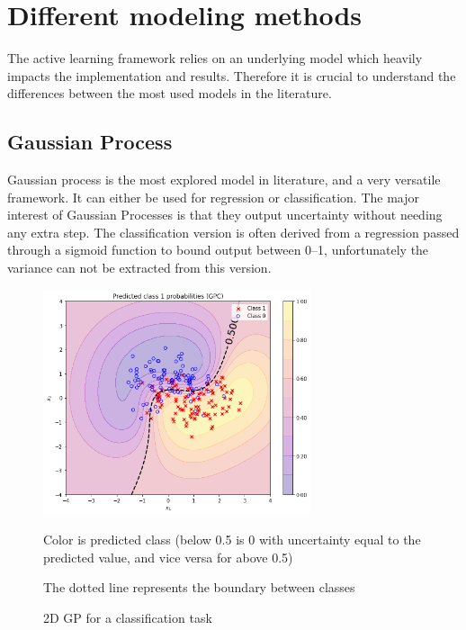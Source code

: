\documentclass[11pt]{article}
\begin{document}
\section{Different modeling methods}
The active learning framework relies on an underlying model which heavily impacts the implementation and results. Therefore it is crucial to understand the differences between the most used models in the literature.

\subsection{Gaussian Process}
Gaussian process is the most explored model in literature, and a very versatile framework\cite{rasmussen_gaussian_2005}. It can either be used for regression or classification. The major interest of Gaussian Processes is that they output uncertainty without needing any extra step. The classification version is often derived from a regression passed through a sigmoid function to bound output between 0--1, unfortunately the variance can not be extracted from this version\cite{jensen_bounded_2013}\cite{nickisch_approximations_2008}\cite{snelson_warped_2003}.

\begin{figure}[H]
  \centering
  \includegraphics[width=0.7\textwidth]{GPC.png}
  \caption{2D GP for a classification task}\label{fig:gpc}

  Color is predicted class (below 0.5 is 0 with uncertainty equal to the predicted value, and vice versa for above 0.5)

  The dotted line represents the boundary between classes
\end{figure}
\end{document}
